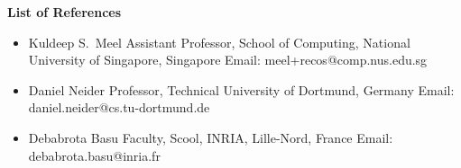 \documentclass[a4paper,10pt]{article}
\begin{document}
	\textbf{List of References}
	\begin{itemize}
		\item Kuldeep S.\ Meel
		\newline
		Assistant Professor, School of Computing, National University of Singapore, Singapore
		\newline
		Email: meel+recos@comp.nus.edu.sg
		\newline
		\item Daniel Neider
		\newline
		Professor,
		Technical University of Dortmund, Germany
		\newline
		Email: daniel.neider@cs.tu-dortmund.de
		\newline
		\item Debabrota Basu
		\newline
		Faculty,
		Scool, INRIA, Lille-Nord, France
		\newline
		Email: debabrota.basu@inria.fr	
	\end{itemize}
\end{document}
